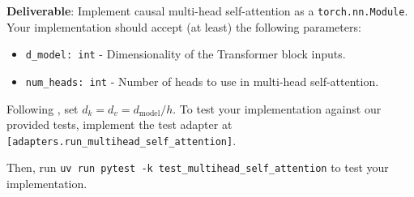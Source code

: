 
\textbf{Deliverable}: Implement causal multi-head self-attention as a \lstinline{torch.nn.Module}. Your implementation should accept (at least) the following parameters:

\begin{itemize}
    \item \lstinline{d_model: int} - Dimensionality of the Transformer block inputs.
    \item \lstinline{num_heads: int} - Number of heads to use in multi-head self-attention.
\end{itemize}

Following \citet{vaswani2017attention}, set $d_k = d_v = d_{\text{model}}/h$. To test your implementation against our provided tests, implement the test adapter at \texttt{[adapters.run\_multihead\_self\_attention]}. 

Then, run \texttt{uv run pytest -k test\_multihead\_self\_attention} to test your implementation.

